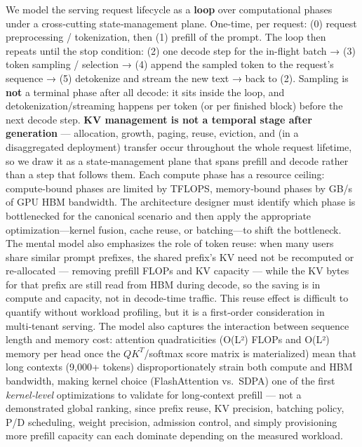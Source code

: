 We model the serving request lifecycle as a \textbf{loop} over
computational phases under a cross‑cutting state‑management plane.
One-time, per request: (0) request preprocessing / tokenization, then
(1) prefill of the prompt. The loop then repeats until the stop
condition: (2) one decode step for the in-flight batch → (3) token
sampling / selection → (4) append the sampled token to the request's
sequence → (5) detokenize and stream the new text → back to (2).
Sampling is \textbf{not} a terminal phase after all decode: it sits
inside the loop, and detokenization/streaming happens per token (or per
finished block) before the next decode step. \textbf{KV management is
not a temporal stage after generation} --- allocation, growth, paging,
reuse, eviction, and (in a disaggregated deployment) transfer occur
throughout the whole request lifetime, so we draw it as a
state‑management plane that spans prefill and decode rather than a step
that follows them. Each compute phase has a resource ceiling:
compute‑bound phases are limited by TFLOPS, memory‑bound phases by GB/s
of GPU HBM bandwidth. The architecture designer must identify which
phase is bottlenecked for the canonical scenario and then apply the
appropriate optimization---kernel fusion, cache reuse, or batching---to
shift the bottleneck. The mental model also emphasizes the role of token
reuse: when many users share similar prompt prefixes, the shared
prefix's KV need not be recomputed or re-allocated --- removing prefill
FLOPs and KV capacity --- while the KV bytes for that prefix are still
read from HBM during decode, so the saving is in compute and capacity,
not in decode-time traffic. This reuse effect is difficult to quantify
without workload profiling, but it is a first‑order consideration in
multi‑tenant serving. The model also captures the interaction between
sequence length and memory cost: attention quadraticities (O(L²) FLOPs
and O(L²) memory per head once the \(QK^{T}\)/softmax score matrix is
materialized) mean that long contexts (9,000+ tokens) disproportionately
strain both compute and HBM bandwidth, making kernel choice
(FlashAttention vs.~SDPA) one of the first \emph{kernel‑level}
optimizations to validate for long‑context prefill --- not a
demonstrated global ranking, since prefix reuse, KV precision, batching
policy, P/D scheduling, weight precision, admission control, and simply
provisioning more prefill capacity can each dominate depending on the
measured workload.

\label{worked-example}


